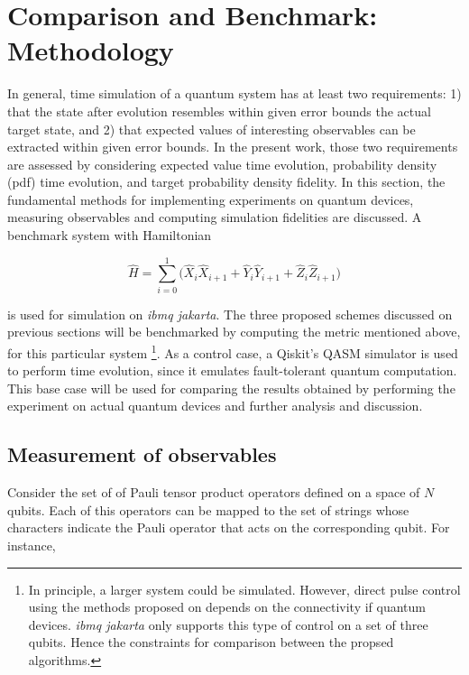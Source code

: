 \section{Comparison and Benchmark: Methodology}
\label{sec:Methodology}

  In general, time simulation of a quantum system has at least two requirements: 1) that the state after evolution resembles within given error bounds the actual target state, and 2) that expected values of interesting observables can be extracted within given error bounds. In the present work, those two requirements are assessed by considering expected value time evolution, probability density (pdf) time evolution, and target probability density fidelity. In this section, the fundamental methods for implementing experiments on quantum devices, measuring observables and computing simulation fidelities are discussed. A benchmark system with Hamiltonian

  \begin{equation}
    \hat{H} = \sum_{i=0}^{1}\Bigg(\hat{X}_i\hat{X}_{i+1} + \hat{Y}_i\hat{Y}_{i+1} + \hat{Z}_i\hat{Z}_{i+1} \Bigg)
    \label{eq:BenchmarkHamiltonian}
  \end{equation}

  \noindent is used for simulation on \textit{ibmq jakarta}. The three proposed schemes discussed on previous sections will be benchmarked by computing the metric mentioned above, for this particular system \footnote{In principle, a larger system could be simulated. However, direct pulse control using the methods proposed on \cite{RXZPulseEfficient} depends on the connectivity if quantum devices. \textit{ibmq jakarta} only supports this type of control on a set of three qubits. Hence the constraints for comparison between the propsed algorithms.}. As a control case, a Qiskit's QASM simulator is used to perform time evolution, since it emulates fault-tolerant quantum computation. This base case will be used for comparing the results obtained by performing the experiment on actual quantum devices and further analysis and discussion.

  \subsection{Measurement of observables}
  \label{subsec:MeasurementMethods}

    Consider the set of of Pauli tensor product operators defined on a space of $N$ qubits. Each of this operators can be mapped to the set of strings whose characters indicate the Pauli operator that acts on the corresponding qubit. For instance,

